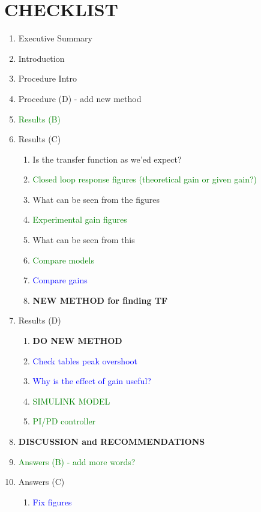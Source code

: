 \documentclass[11pt,a4paper]{article}
\begin{document}
\section{CHECKLIST}
\begin{enumerate}
	\item Executive Summary
	\item Introduction
	\item Procedure Intro
	\item Procedure (D) - add new method
	\item \textcolor{green}{Results (B)}
	\item Results (C)
	\begin{enumerate}
		\item Is the transfer function as we'ed expect?
		\item \textcolor{green}{Closed loop response figures (theoretical gain or given gain?)}
		\item What can be seen from the figures
		\item \textcolor{green}{Experimental gain figures}
		\item What can be seen from this
		\item \textcolor{green}{Compare models}
		\item \textcolor{blue}{Compare gains}
		\item \textbf{NEW METHOD for finding TF}
	\end{enumerate}
	\item Results (D)
	\begin{enumerate}
		\item \textbf{DO NEW METHOD}
		\item \textcolor{blue}{Check tables peak overshoot}
		\item \textcolor{blue}{Why is the effect of gain useful?}
		\item \textcolor{green}{SIMULINK MODEL}
		\item \textcolor{green}{PI/PD controller}
	\end{enumerate}
	\item \textbf{DISCUSSION and RECOMMENDATIONS}
	\item \textcolor{green}{Answers (B) - add more words?}
	\item Answers (C)
	\begin{enumerate}
		\item \textcolor{blue}{Fix figures}

\end{enumerate}
\end{enumerate}
\end{document}
